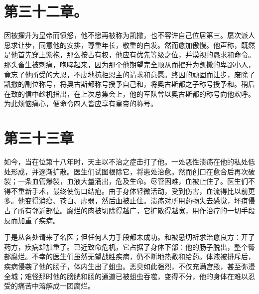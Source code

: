 
\section{第三十二章。}

因被擢升为皇帝而愤怒，他不愿再被称为凯撒，也不容许自己位居第三。屡次派人恳求让步，同意他的安排，尊重年长，敬重的白发。然而愈加傲慢。他声称，既然是他首先穿上紫袍，那么按占有权，他应有优先等级之位，并漠视的恳求和命令。那头畜生被刺痛，咆哮起来，因为那个他期望完全顺从而擢升为凯撒的卑鄙小人，竟忘了他所受的大恩，不虔地抗拒恩主的请求和意愿。终因的顽固而让步，废除了凯撒的副位称号，将奥古斯都称号授予自己和，将奥古斯都之子称号授予和。稍后在致的信中趁机指出，在上次总集会上，他的军队曾以奥古斯都的称号向他欢呼。为此烦恼痛心，便命令四人皆应享有皇帝的称号。\par


\section{第三十三章}

如今，当在位第十八年时，天主以不治之症击打了他。一处恶性溃疡在他的私处低处形成，并逐渐扩散。医生们试图根除它，将患处治愈。然而创口在愈合后再次破裂；一条血管爆裂，血液大量涌出，危及生命。尽管困难，血被止住了。医生们不得不重新手术，最终使伤口结疤。由于身体轻微活动，受到伤害，血流得比以前更多。他变得消瘦、苍白、虚弱，然后血被止住。溃疡对所用药物失去感觉，坏疽侵占了所有邻近部位。腐烂的肉被切除得越广，它扩散得越宽，用作治疗的一切手段反而加重了疾病。\par

\par

于是从各处请来了名医；但任何人力手段都未成功。和被恳切祈求治愈良方：开了药方，疾病却加重了。已近致命危机，它占据了身体下部：他的肠子脱出，整个臀部腐烂。不幸的医生们虽然无望战胜疾病，仍不断地热敷和给药。体液被排斥后，疾病侵袭了他的肠子，体内生出了蛆虫。恶臭如此强烈，不仅充满宫殿，甚至弥漫全城；难怪那时他的膀胱和肠的通道已被蛆虫吞噬，变得不分，他的身体在难以忍受的痛苦中溶解成一团腐烂。\par

